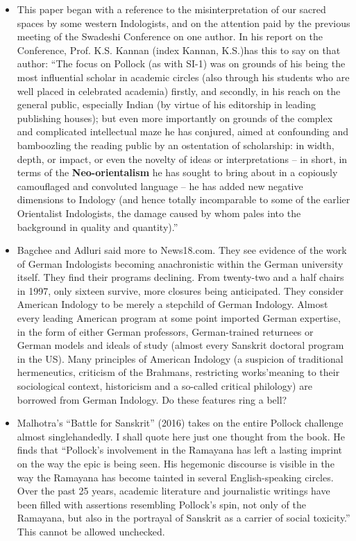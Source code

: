 \begin{itemize}
\item This paper began with a reference to the misinterpretation of our sacred spaces by some western Indologists, and on the attention paid by the previous meeting of the Swadeshi Conference on one author. In his report on the Conference, Prof. K.S. Kannan (index Kannan, K.S.)has this to say on that author: “The focus on Pollock (as with SI-1) was on grounds of his being the most influential scholar in academic circles (also through his students who are well placed in celebrated academia) firstly, and secondly, in his reach on the general public, especially Indian (by virtue of his editorship in leading publishing houses); but even more importantly on grounds of the complex and complicated intellectual maze he has conjured, aimed at confounding and bamboozling the reading public by an ostentation of scholarship: in width, depth, or impact, or even the novelty of ideas or interpretations – in short, in terms of the \textbf{Neo-orientalism} he has sought to bring about in a copiously camouflaged and convoluted language – he has added new negative dimensions to Indology (and hence totally incomparable to some of the earlier Orientalist Indologists, the damage caused by whom pales into the background in quality and quantity).”

 \item Bagchee and Adluri said more to News18.com. They see evidence of the work of German Indologists becoming anachronistic within the German university itself. They find their programs declining. From twenty-two and a half chairs in 1997, only sixteen survive, more closures being anticipated. They consider American Indology to be merely a stepchild of German Indology. Almost every leading American program at some point imported German expertise, in the form of either German professors, German-trained returnees or German models and ideals of study (almost every Sanskrit doctoral program in the US). Many principles of American Indology (a suspicion of traditional hermeneutics, criticism of the Brahmans, restricting works’\break meaning to their sociological context, historicism and a so-called critical philology) are borrowed from German Indology. Do these features ring a bell?

 \item Malhotra’s “Battle for Sanskrit” (2016) takes on the entire Pollock challenge almost singlehandedly. I shall quote here just one thought from the book. He finds that “Pollock’s involvement in the Ramayana has left a lasting imprint on the way the epic is being seen. His hegemonic discourse is visible in the way the Ramayana has become tainted in several English-speaking circles. Over the past 25 years, academic literature and journalistic writings have been filled with assertions resembling Pollock’s spin, not only of the Ramayana, but also in the portrayal of Sanskrit as a carrier of social toxicity.” This cannot be allowed unchecked.


\end{itemize}
